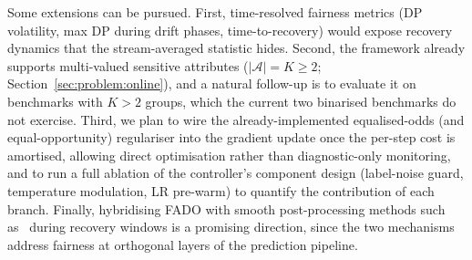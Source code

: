 \documentclass[sigconf,anonymous,review]{acmart}
\begin{document}
Some extensions can be pursued. First, time-resolved fairness metrics (DP volatility, max DP during drift phases, time-to-recovery) would expose recovery
dynamics that the stream-averaged statistic hides. Second, the framework already supports multi-valued sensitive attributes ($|\mathcal{A}|=K\ge 2$;
Section~\ref{sec:problem:online}), and a natural follow-up is to evaluate it on benchmarks with $K>2$ groups, which the current two binarised
benchmarks do not exercise. Third, we plan to wire the already-implemented equalised-odds (and equal-opportunity) regulariser into the gradient update
once the per-step cost is amortised, allowing direct optimisation rather than diagnostic-only monitoring, and to run a full ablation of the controller's
component design (label-noise guard, temperature modulation, LR pre-warm) to quantify the contribution of each branch. Finally, hybridising \textsc{FADO}
with smooth post-processing methods such as~\cite{Small_2024} during recovery windows is a promising direction, since the two mechanisms address fairness
at orthogonal layers of the prediction pipeline.



\end{document}
